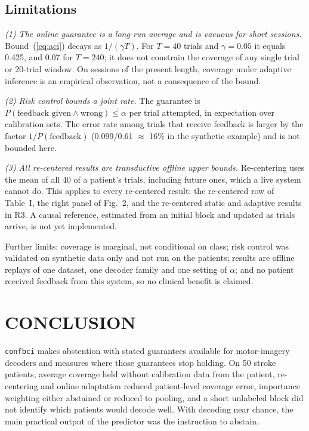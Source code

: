 \documentclass[letterpaper, 10pt, conference]{ieeeconf}
\begin{document}
\subsection{Limitations}
\emph{(1) The online guarantee is a long-run average and is vacuous for short
sessions.} Bound~(\ref{eq:aci}) decays as $1/(\gamma T)$. For $T=40$ trials and
$\gamma=0.05$ it equals 0.425, and 0.07 for $T=240$; it does not constrain the
coverage of any single trial or 20-trial window. On sessions of the present
length, coverage under adaptive inference is an empirical observation, not a
consequence of the bound.

\emph{(2) Risk control bounds a joint rate.} The guarantee is
$P(\text{feedback given}\wedge\text{wrong})\le\alpha$ per trial attempted, in
expectation over calibration sets. The error rate among trials that receive
feedback is larger by the factor $1/P(\text{feedback})$ (0.099/0.61 $\approx$ 16\%
in the synthetic example) and is not bounded here.

\emph{(3) All re-centered results are transductive offline upper bounds.}
Re-centering uses the mean of all 40 of a patient's trials, including future
ones, which a live system cannot do. This applies to every re-centered result:
the re-centered row of Table~I, the right panel of Fig.~2, and the re-centered
static and adaptive results in R3. A causal reference, estimated from an
initial block and updated as trials arrive, is not yet implemented.

Further limits: coverage is marginal, not conditional on class; risk control
was validated on synthetic data only and not run on the patients; results are
offline replays of one dataset, one decoder family and one setting of $\alpha$;
and no patient received feedback from this system, so no clinical benefit is
claimed.

\section{CONCLUSION}
\texttt{confbci} makes abstention with stated guarantees available for
motor-imagery decoders and measures where those guarantees stop holding. On 50
stroke patients, average coverage held without calibration data from the
patient, re-centering and online adaptation reduced patient-level coverage
error, importance weighting either abstained or reduced to pooling, and a short unlabeled block did not
identify which patients would decode well. With decoding near chance, the main
practical output of the predictor was the instruction to abstain.
\end{document}
